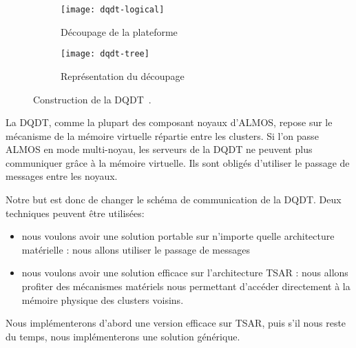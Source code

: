     \begin{figure}[ht]
      \begin{subfigure}[b]{0.5\textwidth}
        \texttt{[image: dqdt-logical]}
        \caption{Découpage de la plateforme}
        \label{fig:dqdt-logical}
      \end{subfigure}
      \begin{subfigure}[b]{0.4\textwidth}
        \texttt{[image: dqdt-tree]}
        \caption{Représentation du découpage}
        \label{fig:dqdt-tree}
      \end{subfigure}
      \caption{Construction de la DQDT~\citep{almaless2014universite}.}
    \end{figure}

    La DQDT, comme la plupart des composant noyaux d'ALMOS, repose sur le
    mécanisme de la mémoire virtuelle répartie entre les clusters. Si l'on passe
    ALMOS en mode multi-noyau, les serveurs de la DQDT ne peuvent plus
    communiquer grâce à la mémoire virtuelle. Ils sont obligés d'utiliser le
    passage de messages entre les noyaux.

    Notre but est donc de changer le schéma de communication de la DQDT. Deux
    techniques peuvent être utilisées:
    \begin{itemize}
      \item nous voulons avoir une solution portable sur n'importe quelle
        architecture matérielle : nous allons utiliser le passage de messages
      \item nous voulons avoir une solution efficace sur l'architecture TSAR :
        nous allons profiter des mécanismes matériels nous permettant d'accéder
        directement à la mémoire physique des clusters voisins.
    \end{itemize}

    Nous implémenterons d'abord une version efficace sur TSAR, puis s'il nous
    reste du temps, nous implémenterons une solution générique.
